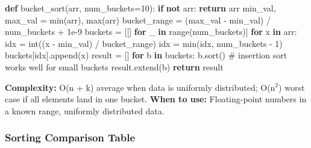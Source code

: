 \documentclass[11pt]{article}
\newenvironment{Shaded}{\begin{snugshade}}{\end{snugshade}}
\newcommand{\BuiltInTok}[1]{\textcolor[rgb]{0.50,0.55,0.55}{#1}}
\newcommand{\CommentTok}[1]{\textcolor[rgb]{0.48,0.49,0.49}{#1}}
\newcommand{\ControlFlowTok}[1]{\textcolor[rgb]{0.99,0.74,0.29}{\textbf{#1}}}
\newcommand{\DecValTok}[1]{\textcolor[rgb]{0.96,0.45,0.00}{#1}}
\newcommand{\FloatTok}[1]{\textcolor[rgb]{0.96,0.45,0.00}{#1}}
\newcommand{\KeywordTok}[1]{\textcolor[rgb]{0.81,0.81,0.76}{\textbf{#1}}}
\newcommand{\NormalTok}[1]{\textcolor[rgb]{0.81,0.81,0.76}{#1}}
\newcommand{\OperatorTok}[1]{\textcolor[rgb]{0.81,0.81,0.76}{#1}}
\begin{document}
\begin{Shaded}
\begin{Highlighting}[]
\KeywordTok{def}\NormalTok{ bucket\_sort(arr, num\_buckets}\OperatorTok{=}\DecValTok{10}\NormalTok{):}
    \ControlFlowTok{if} \KeywordTok{not}\NormalTok{ arr: }\ControlFlowTok{return}\NormalTok{ arr}
\NormalTok{    min\_val, max\_val }\OperatorTok{=} \BuiltInTok{min}\NormalTok{(arr), }\BuiltInTok{max}\NormalTok{(arr)}
\NormalTok{    bucket\_range }\OperatorTok{=}\NormalTok{ (max\_val }\OperatorTok{{-}}\NormalTok{ min\_val) }\OperatorTok{/}\NormalTok{ num\_buckets }\OperatorTok{+} \FloatTok{1e{-}9}
\NormalTok{    buckets }\OperatorTok{=}\NormalTok{ [[] }\ControlFlowTok{for}\NormalTok{ \_ }\KeywordTok{in} \BuiltInTok{range}\NormalTok{(num\_buckets)]}
    \ControlFlowTok{for}\NormalTok{ x }\KeywordTok{in}\NormalTok{ arr:}
\NormalTok{        idx }\OperatorTok{=} \BuiltInTok{int}\NormalTok{((x }\OperatorTok{{-}}\NormalTok{ min\_val) }\OperatorTok{/}\NormalTok{ bucket\_range)}
\NormalTok{        idx }\OperatorTok{=} \BuiltInTok{min}\NormalTok{(idx, num\_buckets }\OperatorTok{{-}} \DecValTok{1}\NormalTok{)}
\NormalTok{        buckets[idx].append(x)}
\NormalTok{    result }\OperatorTok{=}\NormalTok{ []}
    \ControlFlowTok{for}\NormalTok{ b }\KeywordTok{in}\NormalTok{ buckets:}
\NormalTok{        b.sort()        }\CommentTok{\# insertion sort works well for small buckets}
\NormalTok{        result.extend(b)}
    \ControlFlowTok{return}\NormalTok{ result}
\end{Highlighting}
\end{Shaded}

\textbf{Complexity:} O(n + k) average when data is uniformly distributed; O(n\(^2\)) worst case if all elements land in one bucket.
\textbf{When to use:} Floating-point numbers in a known range, uniformly distributed data.

\subsubsection{Sorting Comparison Table}\label{sorting-comparison-table}
\end{document}
